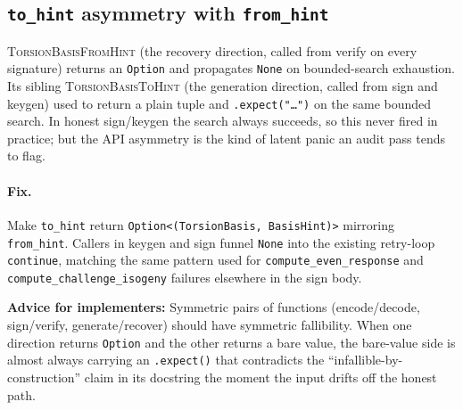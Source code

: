 \subsection{\texttt{to\_hint} asymmetry with \texttt{from\_hint}}
\label{sec:bug-to-hint-asymmetry}

\textsc{TorsionBasisFromHint} (the recovery direction, called
from verify on every signature) returns an \texttt{Option}
and propagates \texttt{None} on bounded-search exhaustion.
Its sibling \textsc{TorsionBasisToHint} (the generation
direction, called from sign and keygen) used to return a
plain tuple and \texttt{.expect("\ldots")} on the same
bounded search.  In honest sign/keygen the search always
succeeds, so this never fired in practice; but the API
asymmetry is the kind of latent panic an audit pass tends to
flag.

\paragraph{Fix.}  Make \texttt{to\_hint} return
\texttt{Option<(TorsionBasis, BasisHint)>} mirroring
\texttt{from\_hint}.  Callers in keygen and sign funnel
\texttt{None} into the existing retry-loop \texttt{continue},
matching the same pattern used for
\texttt{compute\_even\_response} and
\texttt{compute\_challenge\_isogeny} failures elsewhere in
the sign body.

\noindent
\textbf{Advice for implementers:}  Symmetric pairs of
functions (encode/decode, sign/verify, generate/recover)
should have symmetric fallibility.  When one direction
returns \texttt{Option} and the other returns a bare value,
the bare-value side is almost always carrying an
\texttt{.expect()} that contradicts the
``infallible-by-construction'' claim in its docstring
the moment the input drifts off the honest path.

